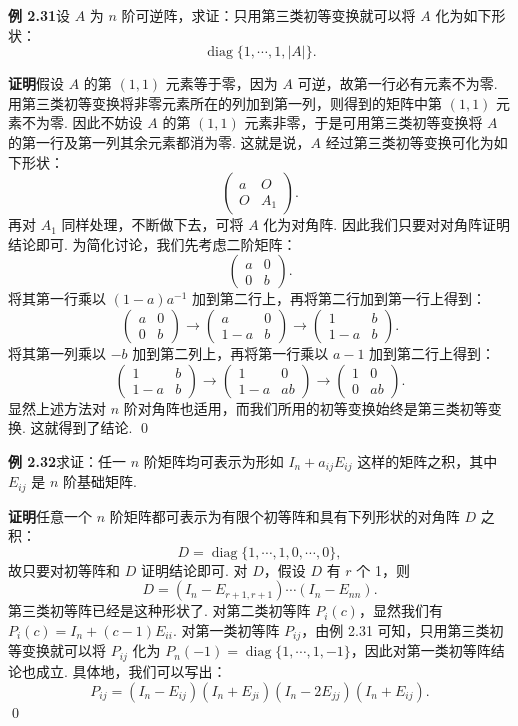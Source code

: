 \documentclass[UTF8, 12pt, fontset=fandol, oneside]{ctexart}
\begin{document}
\noindent\textbf{例 2.31}\quad 设 $A$ 为 $n$ 阶可逆阵，求证：只用第三类初等变换就可以将 $A$ 化为如下形状：
\[
\operatorname{diag}\{1,\cdots,1,|A|\}.
\]

\noindent\textbf{证明}\quad 假设 $A$ 的第 $(1,1)$ 元素等于零，因为 $A$ 可逆，故第一行必有元素不为零. 用第三类初等变换将非零元素所在的列加到第一列，则得到的矩阵中第 $(1,1)$ 元素不为零. 因此不妨设 $A$ 的第 $(1,1)$ 元素非零，于是可用第三类初等变换将 $A$ 的第一行及第一列其余元素都消为零. 这就是说，$A$ 经过第三类初等变换可化为如下形状：
\[
\left(
\begin{array}{cc}
a & O\\
O & A_1
\end{array}
\right).
\]
再对 $A_1$ 同样处理，不断做下去，可将 $A$ 化为对角阵. 因此我们只要对对角阵证明结论即可. 为简化讨论，我们先考虑二阶矩阵：
\[
\left(
\begin{array}{cc}
a & 0\\
0 & b
\end{array}
\right).
\]
将其第一行乘以 $(1-a)a^{-1}$ 加到第二行上，再将第二行加到第一行上得到：
\[
\left(
\begin{array}{cc}
a & 0\\
0 & b
\end{array}
\right)
\to
\left(
\begin{array}{cc}
a & 0\\
1-a & b
\end{array}
\right)
\to
\left(
\begin{array}{cc}
1 & b\\
1-a & b
\end{array}
\right).
\]
将其第一列乘以 $-b$ 加到第二列上，再将第一行乘以 $a-1$ 加到第二行上得到：
\[
\left(
\begin{array}{cc}
1 & b\\
1-a & b
\end{array}
\right)
\to
\left(
\begin{array}{cc}
1 & 0\\
1-a & ab
\end{array}
\right)
\to
\left(
\begin{array}{cc}
1 & 0\\
0 & ab
\end{array}
\right).
\]
显然上述方法对 $n$ 阶对角阵也适用，而我们所用的初等变换始终是第三类初等变换. 这就得到了结论. \qed

\noindent\textbf{例 2.32}\quad 求证：任一 $n$ 阶矩阵均可表示为形如 $I_n+a_{ij}E_{ij}$ 这样的矩阵之积，其中 $E_{ij}$ 是 $n$ 阶基础矩阵.

\noindent\textbf{证明}\quad 任意一个 $n$ 阶矩阵都可表示为有限个初等阵和具有下列形状的对角阵 $D$ 之积：
\[
D=\operatorname{diag}\{1,\cdots,1,0,\cdots,0\},
\]
故只要对初等阵和 $D$ 证明结论即可. 对 $D$，假设 $D$ 有 $r$ 个 1，则
\[
D=(I_n-E_{r+1,r+1})\cdots(I_n-E_{nn}).
\]
第三类初等阵已经是这种形状了. 对第二类初等阵 $P_i(c)$，显然我们有 $P_i(c)=I_n+(c-1)E_{ii}$. 对第一类初等阵 $P_{ij}$，由例 2.31 可知，只用第三类初等变换就可以将 $P_{ij}$ 化为 $P_n(-1)=\operatorname{diag}\{1,\cdots,1,-1\}$，因此对第一类初等阵结论也成立. 具体地，我们可以写出：
\[
P_{ij}=(I_n-E_{ij})(I_n+E_{ji})(I_n-2E_{jj})(I_n+E_{ij}).
\]
\qed
\end{document}
